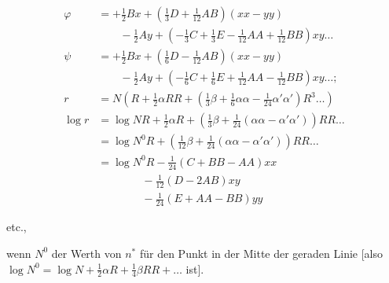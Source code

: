 \[
\begin{aligned}
\varphi&=+\tfrac12Bx+(\tfrac13D+\tfrac1{12}AB)(xx-yy)\\
&\qquad-\tfrac12Ay+(-\tfrac13C+\tfrac13E-\tfrac1{12}AA+\tfrac1{12}BB)xy\ldots\\
\psi&=+\tfrac12Bx+(\tfrac16D-\tfrac1{12}AB)(xx-yy)\\
&\qquad-\tfrac12Ay+(-\tfrac16C+\tfrac16E+\tfrac1{12}AA-\tfrac1{12}BB)xy\ldots;\\[5pt]
r&=N\left(R+\tfrac12\alpha RR+(\tfrac13\beta+\tfrac16\alpha\alpha-\tfrac1{24}\alpha'\alpha')R^3\ldots\right)\\
\log r&=\log NR+\tfrac12\alpha R+\left(\tfrac13\beta+\tfrac1{24}(\alpha\alpha-\alpha'\alpha')\right)RR\ldots\\
&=\log N^0R+\left(\tfrac1{12}\beta+\tfrac1{24}(\alpha\alpha-\alpha'\alpha')\right)RR\ldots\\
&=\log N^0R-\tfrac1{24}(C+BB-AA)xx\\
&\qquad\qquad-\tfrac1{12}(D-2AB)xy\\
&\qquad\qquad-\tfrac1{24}(E+AA-BB)yy
\end{aligned}
\]
\begin{center}etc.,\end{center}
wenn $N^0$ der Werth von $n^*$ für den Punkt in der Mitte der geraden Linie [also $\log N^0=\log N+\tfrac12\alpha R+\tfrac14\beta RR+\ldots$ ist].

